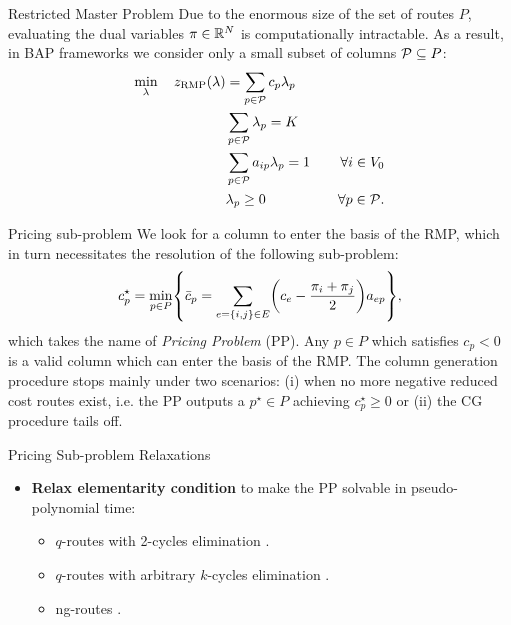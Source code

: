 \begin{frame}{Restricted Master Problem}
	Due to the enormous size of the set of routes $P$, evaluating the dual variables $\pi \in \mathbb R^{N}$ is computationally intractable.
	As a result, in BAP frameworks we consider only a small subset of columns $\mathcal{P} \subseteq P$:
	\begin{align}
		\min_{\lambda} \quad z_{\mathrm{RMP}}(\lambda) & = \sum_{p \in \mathcal{P}}  c_p \lambda_p      & \label{eq:rmp-obj-func}                                                                                                    \\
		                                         & \sum_{p \in \mathcal{P}} \lambda_{p} = K       & \label{eq:rmp-K-routes}                                                                                                    \\
		                                         & \sum_{p \in \mathcal{P}}  a_{ip} \lambda_p = 1 & \quad \forall i \in V_0                                              \label{eq:rmp-customers-visited-by-exactly-one-route} \\
		                                         & \lambda_p \ge 0                         & \quad \forall p \in \mathcal{P} \label{eq:rmp-lambda-mip-var-bounds}.
	\end{align}
\end{frame}

\begin{frame}{Pricing sub-problem}
	We look for a column to enter the basis of the RMP,
	which in turn necessitates the resolution of the following sub-problem:
	\begin{equation}\label{eq:pp-problem-2nd-time}
		{c^\star_p} = \min_{p \in P} \Set*{ \bar{c}_p = \sum_{e = \Set*{i, j} \in E} \Expr*{c_{e} - \frac{\pi_i + \pi_j}{2}} a_{ep}  },
	\end{equation}
	which takes the name of \textit{Pricing Problem} (PP).
	Any $p \in P$ which satisfies $c_p < 0$ is a valid column which can enter the basis of the RMP.
	The column generation procedure stops mainly under two scenarios:
	(i) when no more negative reduced cost routes exist,
	i.e. the PP outputs a $p^\star \in P$ achieving $c^\star_p \ge 0$
	or
	(ii) the CG procedure tails off.

\end{frame}

\begin{frame}{Pricing Sub-problem Relaxations}
	\begin{itemize}
		\item \textbf{Relax elementarity condition} to make the PP solvable in pseudo-polynomial time:
		      \begin{itemize}
			      \item $q$-routes with 2-cycles elimination \parencite{christofides1981exact}.
			      \item $q$-routes with arbitrary $k$-cycles elimination \parencite{feillet2004, chabrier2006}.
			      \item ng-routes \parencite{baldacci2011}.
		      \end{itemize}
	\end{itemize}
\end{frame}

